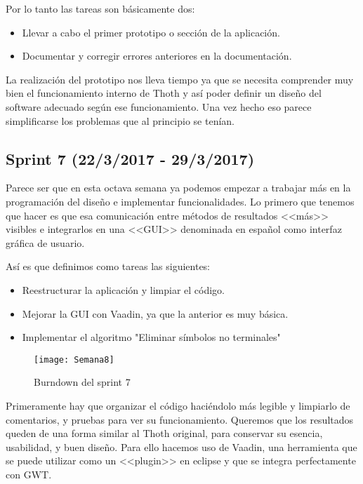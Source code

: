 Por lo tanto las tareas son básicamente dos:

\begin{itemize}
\item Llevar a cabo el primer prototipo o sección de la aplicación.
\item Documentar y corregir errores anteriores en la documentación.
\end{itemize}

La realización del prototipo nos lleva tiempo ya que se necesita comprender muy bien el funcionamiento interno de Thoth y así poder definir un diseño del software adecuado según ese funcionamiento. Una vez hecho eso parece simplificarse los problemas que al principio se tenían.

\subsection{Sprint 7 (22/3/2017 - 29/3/2017)}

Parece ser que en esta octava semana ya podemos empezar a trabajar más en la programación del diseño e implementar funcionalidades. Lo primero que tenemos que hacer es que esa comunicación entre métodos de resultados <<más>> visibles e integrarlos en una <<GUI>> denominada en español como interfaz gráfica de usuario. 

Así es que definimos como tareas las siguientes:

\begin{itemize}
\item Reestructurar la aplicación y limpiar el código.
\item Mejorar la GUI con Vaadin, ya que la anterior es muy básica.
\item Implementar el algoritmo "Eliminar símbolos no terminales"
\end{itemize}

\begin{figure}[h]
\centering
\texttt{[image: Semana8]}
\caption{Burndown del sprint 7}
\label{fig:A.2.6}
\end{figure}

Primeramente hay que organizar el código haciéndolo más legible y limpiarlo de comentarios, y pruebas para ver su funcionamiento. Queremos que los resultados queden de una forma similar al Thoth original, para conservar su esencia, usabilidad, y buen diseño. Para ello hacemos uso de Vaadin, una herramienta que se puede utilizar como un <<plugin>> en eclipse y que se integra perfectamente con GWT.

